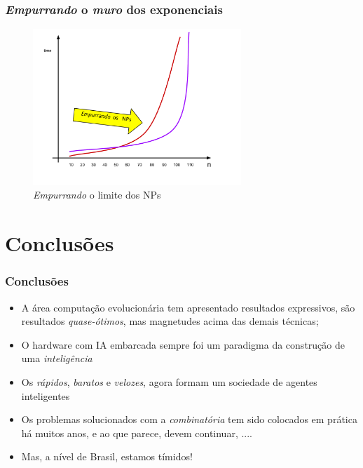 \documentclass{beamer}
\begin{document}


\begin{frame}[fragile]
\frametitle{\textit{Empurrando} o \textit{muro} dos exponenciais}

\begin{figure}[!hb]
\begin{center}
\includegraphics[width=0.7\textwidth , height=0.7\textheight]{figures/Execution-Time-NP-03.pdf}
\caption{{\em Empurrando} o limite dos NPs}
\label{fig_Execution-Time-NP-03}
\end{center}
\end{figure}


\end{frame}



\section{Conclusões}

\begin{frame}[fragile]%
\frametitle{Conclusões}
\begin{block}

  \begin{itemize}
  \item A área computação evolucionária tem apresentado resultados expressivos,   são resultados \textit{quase-ótimos}, mas magnetudes acima das demais técnicas;
  \pause
    
  \item O hardware com IA embarcada sempre foi um paradigma da construção   de uma \textit{inteligência}
    \pause
    
  \item Os \textit{rápidos}, \textit{baratos} e \textit{velozes}, agora formam   um sociedade de agentes inteligentes
    \pause
    
  \item Os problemas solucionados com a \textit{combinatória} tem sido colocados em prática   há muitos anos, e ao que parece, devem continuar, ....
    \pause
  
  \item Mas, a nível de Brasil, estamos tímidos!
  
  \end{itemize}
  \end{block}

\end{frame}
\end{document}
